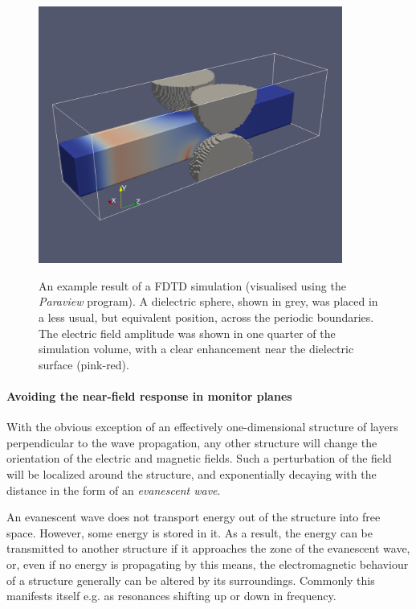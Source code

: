\begin{figure}[ht] \caption{An example result of a FDTD simulation (visualised using the \textit{Paraview} program). A dielectric sphere, shown in grey, was placed in a less usual, but equivalent position, across the periodic boundaries. The electric field amplitude was shown in one quarter of the simulation volume, with a clear enhancement near the dielectric surface (pink-red). }  \centering \includegraphics[width=10cm]{img/sim_screen.pdf} \label{fg_fdtdscreen} \end{figure} 
\paragraph{Avoiding the near-field response in monitor planes} %
\label{par_nearfield}
With the obvious exception of an effectively one-dimensional structure of layers perpendicular to the wave propagation, any other structure will change the orientation of the electric and magnetic fields. Such a perturbation of the field will be localized around the structure, and exponentially decaying with the distance in the form of an \textit{evanescent wave}.

An evanescent wave does not transport energy out of the structure into free space. However, some energy is stored in it. As a result, the energy can be transmitted to another structure if it approaches the zone of the evanescent wave, or, even if no energy is propagating by this means, the electromagnetic behaviour of a structure generally can be altered by its surroundings. Commonly this manifests itself e.g. as resonances shifting up or down in frequency.


